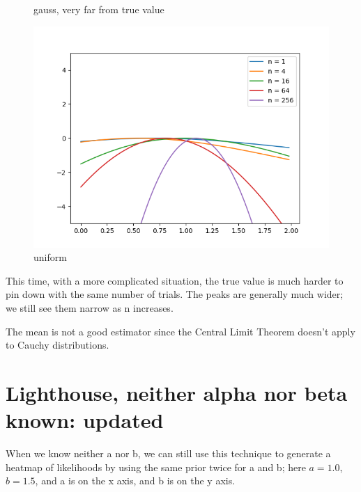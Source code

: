 \documentclass[english]{scrartcl}
\begin{document}
\begin{figure}[H]
	\caption{gauss, very far from true value} 
	\endminipage \hfill
	\includegraphics[width=\linewidth]{lighthouse/1d/h=0.4/unif}
	\caption{uniform} 
	\endminipage \hfill
\end{figure}

\par This time, with a more complicated situation, the true value is much harder to pin down with the same number of trials. The peaks are generally much wider; we still see them narrow as n increases.

\par The mean is not a good estimator since the Central Limit Theorem doesn't apply to Cauchy distributions.

\newpage
\section{Lighthouse, neither alpha nor beta known: updated}
\par When we know neither a nor b, we can still use this technique to generate a heatmap of likelihoods by using the same prior twice for a and b; here $a=1.0$, $b=1.5$, and a is on the x axis, and b is on the y axis.
\end{document}

